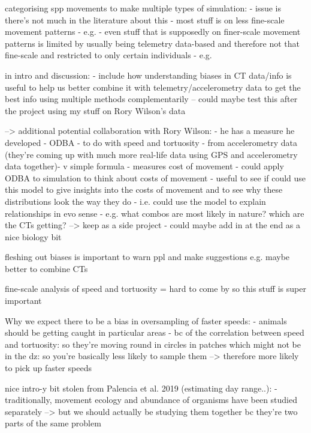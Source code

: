 \documentclass[a4paper,12pt,twoside]{report}
\begin{document}
	
	
	categorising spp movements to make multiple types of simulation:
	- issue is there's not much in the literature about this
	- most stuff is on less fine-scale movement patterns - e.g. \cite{shaw2020causes}
	- even stuff that is supposedly on finer-scale movement patterns is limited by usually being telemetry data-based and therefore not that fine-scale and restricted to only certain individuals 
		- e.g. \cite{leblond2010drives}
	
	
	
	in intro and discussion: 
	- include how understanding biases in CT data/info is useful to help us better combine it with telemetry/accelerometry data to get the best info using multiple methods complementarily
	-- could maybe test this after the project using my stuff on Rory Wilson's data 
	
	--> additional potential collaboration with Rory Wilson:
	- he has a measure he developed - ODBA - to do with speed and tortuosity - from accelerometry data (they're coming up with much more real-life data using GPS and accelerometry data together)- v simple formula
	- measures cost of movement
	- could apply ODBA to simulation to think about costs of movement
	- useful to see if could use this model to give insights into the costs of movement and to see why these distributions look the way they do - i.e. could use the model to explain relationships in evo sense
	- e.g. what combos are most likely in nature? which are the CTs getting?
	--> keep as a side project - could maybe add in at the end as a nice biology bit
	
	
	fleshing out biases is important to warn ppl and make suggestions e.g. maybe better to combine CTs
	
	fine-scale analysis of speed and tortuosity = hard to come by so this stuff is super important
	
	
	
	
	Why we expect there to be a bias in oversampling of faster speeds:
	- animals should be getting caught in particular areas - bc of the correlation between speed and tortuosity: so they're moving round in circles in patches which might not be in the dz: so you're basically less likely to sample them
	--> therefore more likely to pick up faster speeds
	
	
	
	nice intro-y bit stolen from Palencia et al. 2019 (estimating day range..):
	- traditionally, movement ecology and abundance of organisms have been studied separately --> but we should actually be studying them together bc they're two parts of the same problem 
	
\end{document}
